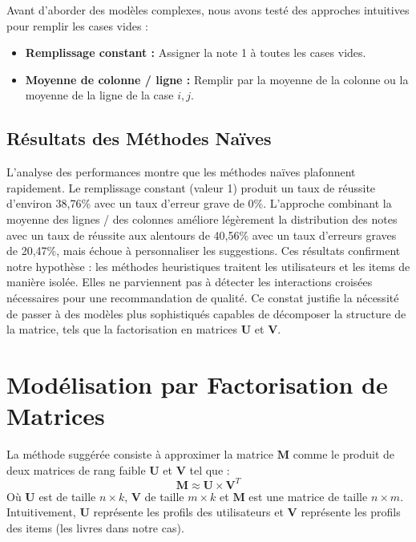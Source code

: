 \documentclass[11pt,a4paper]{article}
\newcommand{\bM}{\boldsymbol{M}}
\newcommand{\bU}{\boldsymbol{U}}
\newcommand{\bV}{\boldsymbol{V}}
\begin{document}
Avant d'aborder des modèles complexes, nous avons testé des approches intuitives pour remplir les cases vides :

\begin{itemize}
    \item \textbf{Remplissage constant :} Assigner la note 1 à toutes les cases vides.
    \item \textbf{Moyenne de colonne / ligne :} Remplir par la moyenne de la colonne ou la moyenne de la ligne de la case $i,j$.
\end{itemize}

\subsection{Résultats des Méthodes Naïves}

L'analyse des performances montre que les méthodes naïves plafonnent rapidement. Le remplissage constant (valeur 1) produit un taux de réussite d'environ 38,76\% avec un taux d'erreur grave de 0\%. 
L'approche combinant la moyenne des lignes / des colonnes améliore légèrement la distribution des notes avec un taux de réussite aux alentours de 40,56\% avec un taux d'erreurs graves de 20,47\%, mais échoue à personnaliser les suggestions.
Ces résultats confirment notre hypothèse : les méthodes heuristiques traitent les utilisateurs et les items de manière isolée. Elles ne parviennent pas à détecter les interactions croisées nécessaires pour une recommandation de qualité. Ce constat justifie la nécessité de passer à des modèles plus sophistiqués capables de décomposer la structure de la matrice, tels que la factorisation en matrices $\bU$ et $\bV$.

\section{Modélisation par Factorisation de Matrices}

La méthode suggérée consiste à approximer la matrice $\bM$ comme le produit de deux matrices de rang faible $\bU$ et $\bV$ tel que :
$$ \bM \approx \bU \times \bV^T $$
Où $\bU$ est de taille $n \times k$, $\bV$ de taille $m \times k$ et $\bM$ est une matrice de taille $n \times m$.
Intuitivement, $\bU$ représente les profils des utilisateurs et $\bV$ représente les profils des items (les livres dans notre cas).
\end{document}
